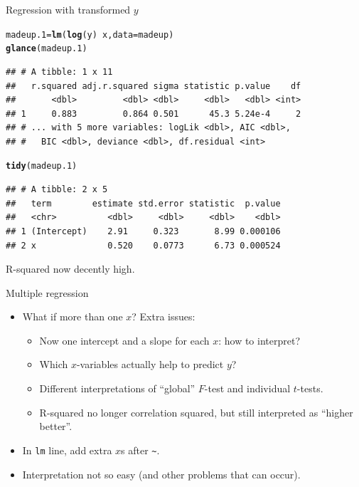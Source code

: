 \documentclass[unknownkeysallowed]{beamer}\usepackage[]{graphicx}\usepackage[]{color}
\makeatletter
\newcommand{\hlopt}[1]{\textcolor[rgb]{0,0,0}{#1}}%
\newcommand{\hlstd}[1]{\textcolor[rgb]{0.345,0.345,0.345}{#1}}%
\newcommand{\hlkwb}[1]{\textcolor[rgb]{0.69,0.353,0.396}{#1}}%
\newcommand{\hlkwc}[1]{\textcolor[rgb]{0.333,0.667,0.333}{#1}}%
\newcommand{\hlkwd}[1]{\textcolor[rgb]{0.737,0.353,0.396}{\textbf{#1}}}%
\newenvironment{kframe}{%
 \def\at@end@of@kframe{}%
 \ifinner\ifhmode%
  \def\at@end@of@kframe{\end{minipage}}%
  \begin{minipage}{\columnwidth}%
 \fi\fi%
 \def\FrameCommand##1{\hskip\@totalleftmargin \hskip-\fboxsep
 \colorbox{shadecolor}{##1}\hskip-\fboxsep
     \hskip-\linewidth \hskip-\@totalleftmargin \hskip\columnwidth}%
 \MakeFramed {\advance\hsize-\width
   \@totalleftmargin\z@ \linewidth\hsize
   \@setminipage}}%
 {\par\unskip\endMakeFramed%
 \at@end@of@kframe}
\newenvironment{knitrout}{}{} %
\makeatother
\begin{document}
\begin{frame}[fragile]{Regression with transformed $y$}

\begin{knitrout}\footnotesize
{}\color{fgcolor}\begin{kframe}
\begin{alltt}
\hlstd{madeup.1}\hlkwb{=}\hlkwd{lm}\hlstd{(}\hlkwd{log}\hlstd{(y)}\hlopt{~}\hlstd{x,} \hlkwc{data}\hlstd{=madeup)}
\hlkwd{glance}\hlstd{(madeup.1)}
\end{alltt}
\begin{verbatim}
## # A tibble: 1 x 11
##   r.squared adj.r.squared sigma statistic p.value    df
##       <dbl>         <dbl> <dbl>     <dbl>   <dbl> <int>
## 1     0.883         0.864 0.501      45.3 5.24e-4     2
## # ... with 5 more variables: logLik <dbl>, AIC <dbl>,
## #   BIC <dbl>, deviance <dbl>, df.residual <int>
\end{verbatim}
\begin{alltt}
\hlkwd{tidy}\hlstd{(madeup.1)}
\end{alltt}
\begin{verbatim}
## # A tibble: 2 x 5
##   term        estimate std.error statistic  p.value
##   <chr>          <dbl>     <dbl>     <dbl>    <dbl>
## 1 (Intercept)    2.91     0.323       8.99 0.000106
## 2 x              0.520    0.0773      6.73 0.000524
\end{verbatim}
\end{kframe}
\end{knitrout}

R-squared now decently high.

\end{frame}


\begin{frame}[fragile]{Multiple regression}

  \begin{itemize}
  \item What if more than one $x$? Extra issues: %
    \begin{itemize}
    \item Now one intercept and a slope for each $x$: how to interpret?
    \item Which $x$-variables actually help to predict $y$?

    \item Different interpretations of ``global'' $F$-test and individual $t$-tests.
    \item R-squared no longer correlation squared, but still
      interpreted as ``higher better''.
    \end{itemize}
  \item In \verb-lm- line, add extra $x$s after \verb-~-.
  \item Interpretation not so easy (and other problems that can occur).
  \end{itemize}

\end{frame}
\end{document}
